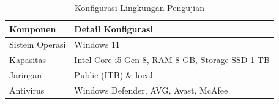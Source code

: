 \begin{table}[H]
\captionsetup{justification=raggedright,singlelinecheck=false}
\centering
\begin{tabular}{|p{4cm}|p{9cm}|}
\hline
\textbf{Komponen} & \textbf{Detail Konfigurasi} \\
\hline

Sistem Operasi & Windows 11 \\
\hline

Kapasitas & Intel Core i5 Gen 8, RAM 8 GB, Storage SSD 1 TB \\
\hline

Jaringan & Public (ITB) \& local \\
\hline

Antivirus & Windows Defender, AVG, Avast, McAfee \\
\hline
\end{tabular}

\caption{Konfigurasi Lingkungan Pengujian}
\label{tbl:konfigurasi-pengujian}
\end{table}

